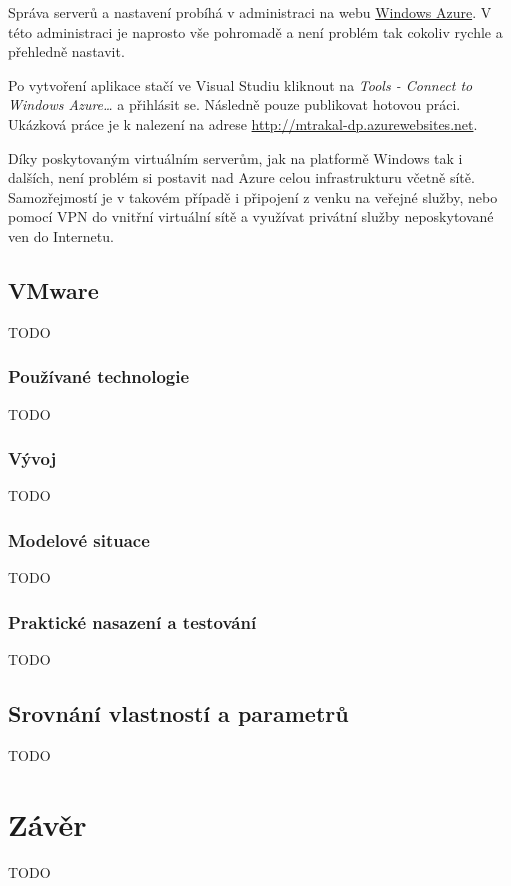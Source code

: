 Správa serverů a nastavení probíhá v administraci na webu \href{https://manage.windowsazure.com}{Windows Azure\cite{azure:manage}}. V této administraci je naprosto vše pohromadě a není problém tak cokoliv rychle a přehledně nastavit.

Po vytvoření aplikace stačí ve Visual Studiu kliknout na \textit{Tools - Connect to Windows Azure\ldots} a přihlásit se. Následně pouze publikovat hotovou práci. Ukázková práce je k nalezení na adrese \href{http://mtrakal-dp.azurewebsites.net}{http://mtrakal-dp.azurewebsites.net}.

Díky poskytovaným virtuálním serverům, jak na platformě Windows tak i dalších, není problém si postavit nad Azure celou infrastrukturu včetně sítě. Samozřejmostí je v takovém případě i připojení z venku na veřejné služby, nebo pomocí VPN do vnitřní virtuální sítě a využívat privátní služby neposkytované ven do Internetu.

\subsection{VMware}
TODO
\subsubsection{Používané technologie}
TODO
\subsubsection{Vývoj}
TODO
\subsubsection{Modelové situace}
TODO
\subsubsection{Praktické nasazení a testování}
TODO

\subsection{Srovnání vlastností a parametrů}
TODO

\newpage
\section{Závěr}
TODO